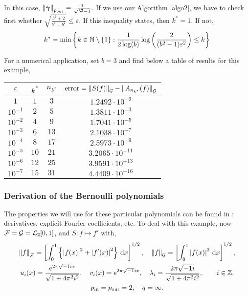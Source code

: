 \documentclass[final]{elsarticle}
\newcommand{\pin}{p_{\text{\rm{in}}}}
\newcommand{\pout}{p_{\text{\rm{out}}}}
\newcommand{\bgamma}{\boldsymbol\gamma}
\theoremstyle{definition}
\theoremstyle{remark}
\begin{document}
In this case, $\norm[\pout]{\bgamma}=\frac{1}{\sqrt{b^2-1}}$. If we use our Algorithm \ref{algo2}, we have to check first whether $\sqrt{\frac{b^2+2}{b^4-b^2}}\le\varepsilon$. If this inequality states, then $k^*=1$. If not,
\begin{equation*}
k^*=\min\left\{k\in\naturals\setminus\{1\}:\frac{1}{2\log(b)}\log\left(\frac{2}{(b^2-1)\varepsilon^2}\right) \le k \right\}
\end{equation*}

For a numerical application, set $b=3$ and find below a table of results for this example,

\begin{center}
\begin{tabular}{|c|c|c|c|}
  \hline
  $\varepsilon$ & $k^*$ & $n_{k^*}$ & $\operatorname{error}=\norm[\cg]{S(f)}-\norm[\cg]{A_{n_{k^*}}(f)}$ \\
  \hline
  $1$ & $1$ & $3$ & $1.2492\cdot10^{-2}$ \\
  $10^{-1}$ & $2$ & $5$ & $1.3811\cdot10^{-3}$ \\
  $10^{-2}$ & $4$ & $9$ & $1.7041\cdot10^{-5}$ \\
  $10^{-3}$ & $6$ & $13$ & $2.1038\cdot10^{-7}$ \\
  $10^{-4}$ & $8$ & $17$ & $2.5973\cdot10^{-9}$ \\
  $10^{-5}$ & $10$ & $21$ & $3.2065\cdot10^{-11}$ \\
  $10^{-6}$ & $12$ & $25$ & $3.9591\cdot10^{-13}$ \\
  $10^{-7}$ & $15$ & $31$ & $4.4409\cdot10^{-16}$ \\
  \hline
\end{tabular}
\end{center}

\subsubsection{Derivation of the Bernoulli polynomials}

The properties we will use for these particular polynomials can be found in \cite{AbrSte64}: derivatives, explicit Fourier coefficients, etc. To deal with this example, now $\cf=\cg=\cl_2[0,1]$, and $S: f \mapsto f'$ with,
\begin{gather*}
\norm[\cf]{f} = \left[\int_0^1 \left\{\abs{f(x)}^2 + \abs{f'(x)}^2\right\}\, \dif x\right]^{1/2}, \quad \norm[\cg]{f} = \left[\int_0^1 \abs{f(x)}^2 \, \dif x \right]^{1/2}, \\
u_{i}(x) = \frac{\me^{2 \pi \sqrt{-1} i x}}{\sqrt{1+4 \pi^2 i^2}}, \quad v_i(x) = \me^{2 \pi \sqrt{-1} i x}, \quad \lambda_i=\frac{2 \pi \sqrt{-1} i}{\sqrt{1+4 \pi^2 i^2}}, \qquad i \in \integers,\\
\pin=\pout=2,\quad q=\infty.
\end{gather*}
\end{document}
